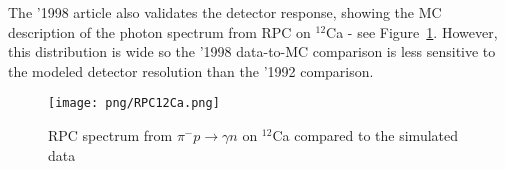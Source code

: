  The '1998 article also validates the detector response, showing the MC description of the
 photon spectrum from RPC on $^{12}$Ca  - see Figure~\ref{fig:art9}. However, this distribution
 is wide so the '1998 data-to-MC comparison is less sensitive to the modeled detector resolution
 than the '1992 comparison.

\begin{figure}[!h]
 \begin{center}
 \texttt{[image: png/RPC12Ca.png]} 
 \end{center}
 \caption{RPC spectrum from  $\pi^{-}p \rightarrow \gamma n$ on  $^{12}$Ca compared to the simulated data }
 \label{fig:art9}
 \end{figure}
